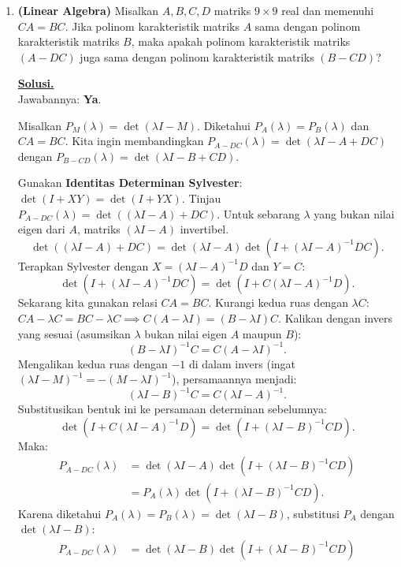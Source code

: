 \documentclass[12pt,twoside]{article}
\newenvironment{solution}
{
	\par\noindent\textbf{\underline{Solusi.}}\\
}
{
	\par
}
\begin{document}
\begin{enumerate}
  \item \textbf{(Linear Algebra)} Misalkan $A, B, C, D$ matriks $9 \times 9$ real dan memenuhi $CA = BC$. Jika polinom karakteristik matriks $A$ sama dengan polinom karakteristik matriks $B$, maka apakah polinom karakteristik matriks $(A - DC)$ juga sama dengan polinom karakteristik matriks $(B - CD)$?
        \begin{solution}
          Jawabannya: \textbf{Ya}.

          Misalkan $P_M(\lambda) = \det(\lambda I - M)$.
          Diketahui $P_A(\lambda) = P_B(\lambda)$ dan $CA = BC$.
          Kita ingin membandingkan $P_{A-DC}(\lambda) = \det(\lambda I - A + DC)$ dengan $P_{B-CD}(\lambda) = \det(\lambda I - B + CD)$.

          Gunakan \textbf{Identitas Determinan Sylvester}: $\det(I + XY) = \det(I + YX)$.
          Tinjau $P_{A-DC}(\lambda) = \det((\lambda I - A) + DC)$.
          Untuk sebarang $\lambda$ yang bukan nilai eigen dari $A$, matriks $(\lambda I - A)$ invertibel.
          \[ \det((\lambda I - A) + DC) = \det(\lambda I - A) \det(I + (\lambda I - A)^{-1} D C). \]
          Terapkan Sylvester dengan $X = (\lambda I - A)^{-1} D$ dan $Y = C$:
          \[ \det(I + (\lambda I - A)^{-1} D C) = \det(I + C (\lambda I - A)^{-1} D). \]
          Sekarang kita gunakan relasi $CA = BC$.
          Kurangi kedua ruas dengan $\lambda C$: $CA - \lambda C = BC - \lambda C \implies C(A - \lambda I) = (B - \lambda I)C$.
          Kalikan dengan invers yang sesuai (asumsikan $\lambda$ bukan nilai eigen $A$ maupun $B$):
          \[ (B - \lambda I)^{-1} C = C (A - \lambda I)^{-1}. \]
          Mengalikan kedua ruas dengan $-1$ di dalam invers (ingat $(\lambda I - M)^{-1} = -(M - \lambda I)^{-1}$), persamaannya menjadi:
          \[ (\lambda I - B)^{-1} C = C (\lambda I - A)^{-1}. \]
          Substitusikan bentuk ini ke persamaan determinan sebelumnya:
          \[ \det(I + C (\lambda I - A)^{-1} D) = \det(I + (\lambda I - B)^{-1} C D). \]
          Maka:
          \[ \begin{aligned}
              P_{A-DC}(\lambda) & = \det(\lambda I - A) \det(I + (\lambda I - B)^{-1} C D) \\
                                & = P_A(\lambda) \det(I + (\lambda I - B)^{-1} C D).
            \end{aligned} \]
          Karena diketahui $P_A(\lambda) = P_B(\lambda) = \det(\lambda I - B)$, substitusi $P_A$ dengan $\det(\lambda I - B)$:
          \[ \begin{aligned}
              P_{A-DC}(\lambda) & = \det(\lambda I - B) \det(I + (\lambda I - B)^{-1} C D) \\

\end{aligned}\]
\end{solution}
\end{enumerate}
\end{document}
